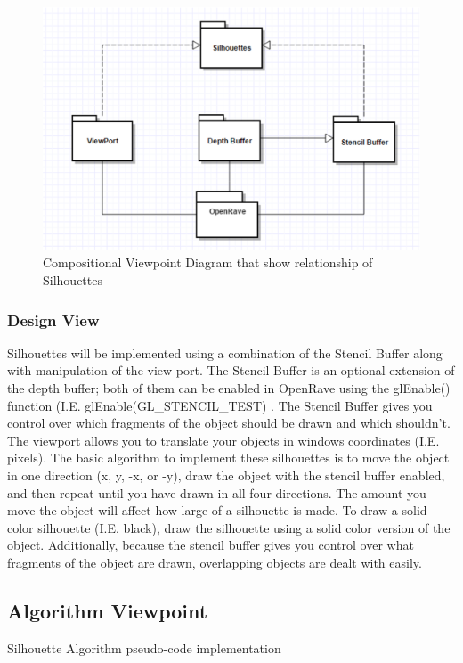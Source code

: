 \documentclass[10pt,journal,compsoc,draftclsnofoot]{IEEEtran}
\begin{document}
\begin{flushleft}
\begin{figure} [H]
  \includegraphics[scale=0.9]{Silhouettes_composition.eps}
  \caption
{ \newline \hspace{\linewidth}
Compositional Viewpoint Diagram that show relationship of Silhouettes}
  \label{fig:Silhouettes_composition}
\end{figure}

\subsubsection{Design View}
Silhouettes will be implemented using a combination of the Stencil Buffer along with manipulation of the view port.
The Stencil Buffer is an optional extension of the depth buffer; both of them can be enabled in OpenRave using the glEnable() function (I.E. glEnable(GL\_STENCIL\_TEST) \cite{depthstencils}.
The Stencil Buffer gives you control over which fragments of the object should be drawn and which shouldn’t.
The viewport allows you to translate your objects in windows coordinates (I.E. pixels).
The basic algorithm to implement these silhouettes is to move the object in one direction (x, y, -x, or -y), draw the object with the stencil buffer enabled, and then repeat until you have drawn in all four directions.
The amount you move the object will affect how large of a silhouette is made.
To draw a solid color silhouette (I.E. black), draw the silhouette using a solid color version of the object.
Additionally, because the stencil buffer gives you control over what fragments of the object are drawn, overlapping objects are dealt with easily.

\subsection{Algorithm Viewpoint}
Silhouette Algorithm pseudo-code implementation


\end{flushleft}
\end{document}
